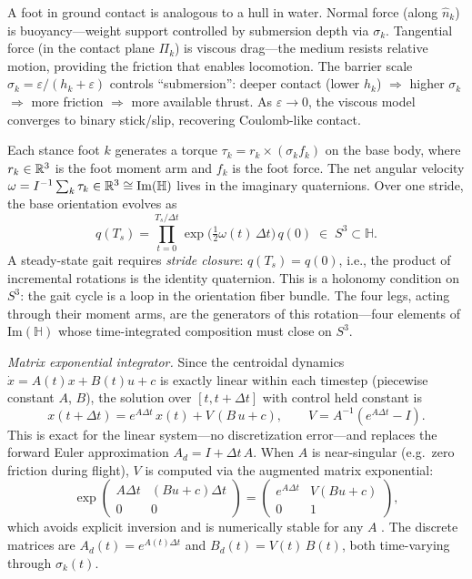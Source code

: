 \begin{remark}\label{rem:buoyancy}
A foot in ground contact is analogous to a hull in water.
Normal force (along $\hat{n}_k$) is buoyancy---weight
support controlled by submersion depth via $\sigma_k$.
Tangential force (in the contact plane $\Pi_k$) is viscous drag---the
medium resists relative motion, providing the friction that enables
locomotion.
The barrier scale $\sigma_k = \varepsilon/(h_k + \varepsilon)$ controls
``submersion'': deeper contact (lower $h_k$) $\Rightarrow$ higher
$\sigma_k$ $\Rightarrow$ more friction $\Rightarrow$ more available thrust.
As $\varepsilon \to 0$, the viscous model converges to binary stick/slip,
recovering Coulomb-like contact.
\end{remark}

\begin{remark}
\label{rem:quaternion-closure}
Each stance foot $k$ generates a torque
$\tau_k = r_k \times (\sigma_k f_k)$ on the base body, where
$r_k \in \mathbb{R}^3$ is the foot moment arm and $f_k$ is the foot
force.
The net angular velocity
$\omega = I^{-1}\sum_k \tau_k \in \mathbb{R}^3 \cong \mathrm{Im}(\mathbb{H})$
lives in the imaginary quaternions.
Over one stride, the base orientation evolves as
\[
  q(T_s) = \prod_{t=0}^{T_s/\Delta t}
    \exp\bigl(\tfrac{1}{2}\omega(t)\,\Delta t\bigr)\, q(0)
    \;\in\; S^3 \subset \mathbb{H}.
\]
A steady-state gait requires \emph{stride closure}:
$q(T_s) = q(0)$, i.e., the product of incremental rotations is the
identity quaternion.
This is a holonomy condition on $S^3$: the gait cycle is a loop
in the orientation fiber bundle.
The four legs, acting through their moment arms, are the generators
of this rotation---four elements of $\mathrm{Im}(\mathbb{H})$
whose time-integrated composition must close on $S^3$.
\end{remark}

\smallskip\noindent\emph{Matrix exponential integrator.}
Since the centroidal dynamics $\dot{x} = A(t)x + B(t)u + c$ is exactly
linear within each timestep (piecewise constant $A$, $B$), the solution
over $[t, t{+}\Delta t]$ with control held constant is
\begin{equation}\label{eq:matrix-exp}
x(t{+}\Delta t) = e^{A\Delta t}\, x(t) + V\,(B\, u + c),
\qquad V = A^{-1}(e^{A\Delta t} - I).
\end{equation}
This is exact for the linear system---no discretization error---and
replaces the forward Euler approximation $A_d = I + \Delta t\, A$.
When $A$ is near-singular (e.g.\ zero friction during flight),
$V$ is computed via the augmented matrix exponential:
\[
\exp\!\begin{pmatrix} A\Delta t & (Bu + c)\Delta t \\ 0 & 0 \end{pmatrix}
= \begin{pmatrix} e^{A\Delta t} & V(Bu + c) \\ 0 & 1 \end{pmatrix},
\]
which avoids explicit inversion and is numerically stable for any $A$
\cite{HighamExpm}.
The discrete matrices are $A_d(t) = e^{A(t)\Delta t}$ and
$B_d(t) = V(t)\, B(t)$, both time-varying through $\sigma_k(t)$.

